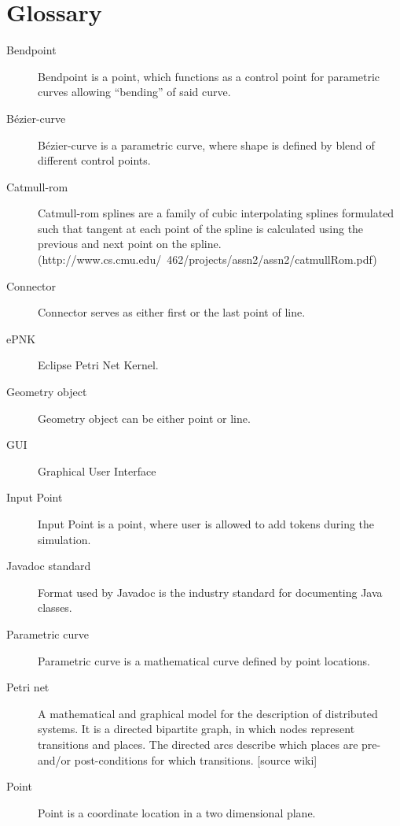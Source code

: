 \section{Glossary}
\begin{description}

\item [Bendpoint] Bendpoint is a point, which functions as a control point for parametric curves allowing “bending” of said curve.

\item [Bézier-curve] Bézier-curve is a parametric curve, where shape is defined by blend of different control points.

\item [Catmull-rom] Catmull-rom splines are a family of cubic interpolating splines formulated such that tangent at each point of the spline is calculated using the previous and next point on the spline. (http://www.cs.cmu.edu/~462/projects/assn2/assn2/catmullRom.pdf)

\item [Connector]  Connector serves as either first or the last point of line.

\item [ePNK] Eclipse Petri Net Kernel.

\item [Geometry object] Geometry object can be either point or line.

\item [GUI] Graphical User Interface

\item [Input Point] Input Point is a point, where user is allowed to add tokens during the simulation.

\item [Javadoc standard] Format used by Javadoc is the industry standard for documenting Java classes.

\item [Parametric curve] Parametric curve is a mathematical curve defined by point locations.

\item [Petri net] A mathematical and graphical model for the description of distributed systems. It is a directed bipartite graph, in which nodes represent transitions and places. The directed arcs describe which places are pre- and/or post-conditions for which transitions. [source wiki]

\item [Point] Point is a coordinate location in a two dimensional plane.


\end{description}
